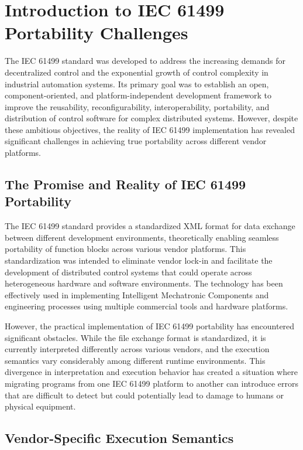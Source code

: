 
\section{Introduction to IEC 61499 Portability Challenges}

The IEC 61499 standard was developed to address the increasing demands for decentralized control and the exponential growth of control complexity in industrial automation systems. Its primary goal was to establish an open, component-oriented, and platform-independent development framework to improve the reusability, reconfigurability, interoperability, portability, and distribution of control software for complex distributed systems. However, despite these ambitious objectives, the reality of IEC 61499 implementation has revealed significant challenges in achieving true portability across different vendor platforms.

\subsection{The Promise and Reality of IEC 61499 Portability}

The IEC 61499 standard provides a standardized XML format for data exchange between different development environments, theoretically enabling seamless portability of function blocks across various vendor platforms. This standardization was intended to eliminate vendor lock-in and facilitate the development of distributed control systems that could operate across heterogeneous hardware and software environments. The technology has been effectively used in implementing Intelligent Mechatronic Components and engineering processes using multiple commercial tools and hardware platforms.

However, the practical implementation of IEC 61499 portability has encountered significant obstacles. While the file exchange format is standardized, it is currently interpreted differently across various vendors, and the execution semantics vary considerably among different runtime environments. This divergence in interpretation and execution behavior has created a situation where migrating programs from one IEC 61499 platform to another can introduce errors that are difficult to detect but could potentially lead to damage to humans or physical equipment.

\subsection{Vendor-Specific Execution Semantics}


